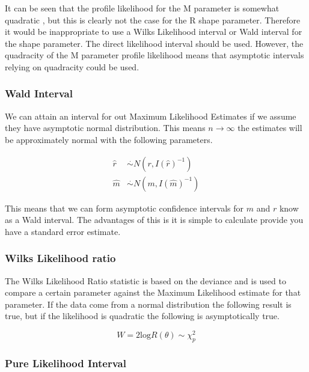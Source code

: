 \documentclass[11pt,preprint, authoryear]{elsarticle}
\numberwithin{equation}{section}
\numberwithin{figure}{section}
\numberwithin{table}{section}
\begin{document}
It can be seen that the profile likelihood for the M parameter is
somewhat quadratic , but this is clearly not the case for the R shape
parameter. Therefore it would be inappropriate to use a Wilks Likelihood
interval or Wald interval for the shape parameter. The direct likelihood
interval should be used. However, the quadracity of the M parameter
profile likelihood means that asymptotic intervals relying on quadracity
could be used.

\subsubsection{}\label{section}

\subsubsection{Wald Interval}\label{wald-interval}

We can attain an interval for out Maximum Likelihood Estimates if we
assume they have asymptotic normal distribution. This means
\(n\to\infty\) the estimates will be approximately normal with the
following parameters.

\begin{align*}
\hat{r} & \stackrel{.}{\sim} N(r,I(\hat{r})^{-1}) \\ 
\hat{m} & \stackrel{.}{\sim} N(m,I(\hat{m})^{-1})
\end{align*}

This means that we can form asymptotic confidence intervals for \(m\)
and \(r\) know as a Wald interval. The advantages of this is it is
simple to calculate provide you have a standard error estimate.

\subsubsection{Wilks Likelihood ratio}\label{wilks-likelihood-ratio}

The Wilks Likelihood Ratio statistic is based on the deviance and is
used to compare a certain parameter against the Maximum Likelihood
estimate for that parameter. If the data come from a normal distribution
the following result is true, but if the likelihood is quadratic the
following is asymptotically true.

\[W = 2\text{log}R(\theta) \sim \chi^2_p\]

\subsubsection{Pure Likelihood Interval}\label{pure-likelihood-interval}
\end{document}
